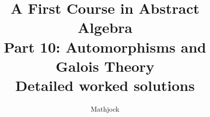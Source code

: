 
\title{\textbf{A First Course in Abstract Algebra}\\[0.3em]Part 10: Automorphisms and Galois Theory\\[0.3em]\large Detailed worked solutions}
\author{Mathjock}
\date{}

\maketitle
\bookinfo
\tableofcontents
\clearpage
\renewcommand{\thesection}{48}
\renewcommand{\theHsection}{fraleigh.48}

\clearpage
\renewcommand{\thesection}{49}
\renewcommand{\theHsection}{fraleigh.49}

\clearpage
\renewcommand{\thesection}{50}
\renewcommand{\theHsection}{fraleigh.50}

\clearpage
\renewcommand{\thesection}{51}
\renewcommand{\theHsection}{fraleigh.51}

\clearpage
\renewcommand{\thesection}{52}
\renewcommand{\theHsection}{fraleigh.52}

\clearpage
\renewcommand{\thesection}{53}
\renewcommand{\theHsection}{fraleigh.53}

\clearpage
\renewcommand{\thesection}{54}
\renewcommand{\theHsection}{fraleigh.54}

\clearpage
\renewcommand{\thesection}{55}
\renewcommand{\theHsection}{fraleigh.55}

\clearpage
\renewcommand{\thesection}{56}
\renewcommand{\theHsection}{fraleigh.56}


